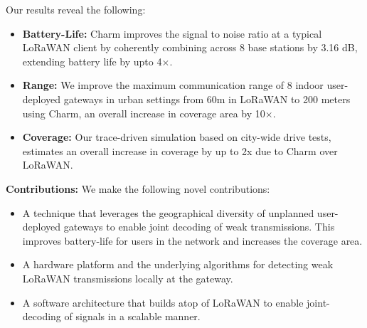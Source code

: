 
Our results reveal the following:

\begin{itemize}
    \item {\bf Battery-Life: }Charm improves the signal to noise ratio at a typical LoRaWAN client by coherently combining across 8 base stations by 3.16 dB, extending battery life by upto 4$\times$.
    \item {\bf Range: } We improve the maximum communication range of 8 indoor user-deployed gateways in urban settings from 60m in LoRaWAN to 200 meters using Charm, an overall increase in coverage area by 10$\times$.
    \item {\bf Coverage: } Our trace-driven simulation based on city-wide drive tests, estimates an overall increase in coverage by up to 2x due to Charm over LoRaWAN. 
\end{itemize}


\noindent \textbf{Contributions:} We make the following novel contributions:
\begin{itemize}
    \item A technique that leverages the geographical diversity of unplanned user-deployed gateways to enable joint decoding of weak transmissions. This improves battery-life for users in the network and increases the coverage area.
    \item A hardware platform and the underlying algorithms for detecting weak LoRaWAN transmissions locally at the gateway. 
    \item A software architecture that builds atop of LoRaWAN to enable joint-decoding of signals in a scalable manner.
\end{itemize}

















